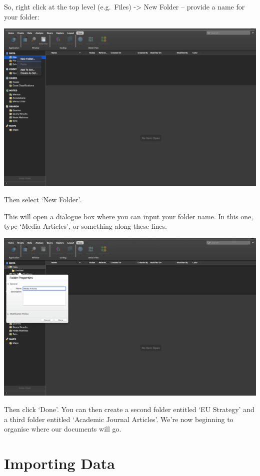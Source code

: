 \documentclass[
]{book}
\begin{document}
So, right click at the top level (e.g.~Files) -\textgreater{} New Folder -- provide a name for your folder:

\includegraphics{imgs/new_folder.png}

Then select `New Folder'.

This will open a dialogue box where you can input your folder name. In this one, type `Media Articles', or something along these lines.

\includegraphics{imgs/name_folder.png}

Then click `Done'. You can then create a second folder entitled `EU Strategy' and a third folder entitled `Academic Journal Articles'. We're now beginning to organise where our documents will go.

\hypertarget{importing-data}{%
\section{Importing Data}\label{importing-data}}
\end{document}
